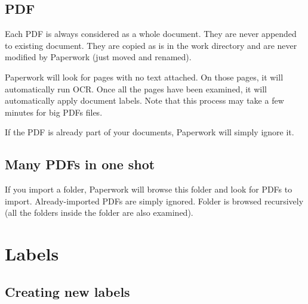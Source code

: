 \documentclass[10pt,a4paper]{article}
\begin{document}
\subsection{PDF}

Each PDF is always considered as a whole document. They are never
appended to existing document. They are copied as is in the work directory
and are never modified by Paperwork (just moved and renamed).

Paperwork will look for pages with no text attached. On those pages,
it will automatically run OCR. Once all the pages have been examined,
it will automatically apply document labels. Note that this process
may take a few minutes for big PDFs files.

If the PDF is already part of your documents, Paperwork will simply
ignore it.

\subsection{Many PDFs in one shot}

If you import a folder, Paperwork will browse this folder and look
for PDFs to import. Already-imported PDFs are simply ignored. Folder
is browsed recursively (all the folders inside the folder are also
examined).

\section{Labels}

\subsection{Creating new labels}

\end{document}
